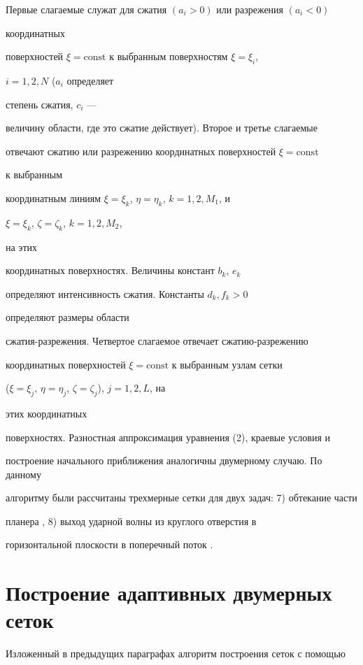 Первые слагаемые служат для сжатия $(a_i>0)$ или разрежения $(a_i<0)$ 


координатных 


поверхностей $\xi=\text{const}$ к выбранным поверхностям $\xi=\xi_i$, 


$i=1,2,N$ ($a_i$ определяет 


степень сжатия, $c_i$ --- 


величину области, где это сжатие действует). Второе и третье слагаемые 


отвечают сжатию или разрежению координатных поверхностей $\xi=\text{const}$ 


к выбранным 


координатным линиям $\xi=\xi_k$, $\eta=\eta_k$, $k=1,2,M_1$, и 


$\xi=\xi_k$, $\zeta=\zeta_k$, $k=1,2,M_2$, 


на этих 


координатных поверхностях. Величины констант $b_k$, $e_k$


определяют интенсивность сжатия. Константы $d_k,f_k>0$ 


определяют размеры области 


сжатия-разрежения. Четвертое слагаемое отвечает сжатию-разрежению 


координатных поверхностей $\xi=\text{const}$ к выбранным узлам сетки 


($\xi=\xi_j$, $\eta=\eta_j$, $\zeta=\zeta_j$), $j=1,2,L$, на 


этих координатных 


поверхностях. Разностная аппроксимация уравнения (2), краевые условия и 


построение начального приближения аналогичны двумерному случаю. По данному 


алгоритму были рассчитаны трехмерные сетки для двух задач: 7) обтекание части 


планера \cite{Mar3}, 8) выход ударной волны из круглого отверстия в 


горизонтальной плоскости в поперечный поток \cite{Mar2}. 


 


\section{Построение адаптивных двумерных сеток} 


 


Изложенный в предыдущих параграфах алгоритм построения сеток с помощью 


